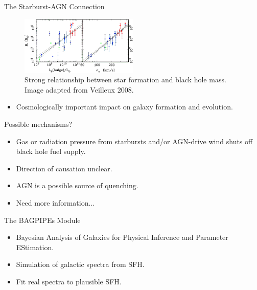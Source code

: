 \documentclass{beamer}
\begin{document}
\begin{frame}{The Starburst-AGN Connection}
  \begin{figure}
    \centering
    \includegraphics[width=0.5\textwidth]{image--002}
    \caption{Strong relationship between star formation and black hole mass. Image adapted from Veilleux 2008.\cite{Veilleux_2008}}
  \end{figure}
  \pause
  \begin{itemize}
    \item Cosmologically important impact on galaxy formation and evolution.
  \end{itemize}
\end{frame}

\begin{frame}{Possible mechanisms?}
  \begin{itemize}
    \item Gas or radiation pressure from starbursts and/or AGN-drive wind shuts off  black hole fuel supply.\pause
    \item Direction of causation unclear.\pause
    \item AGN is a possible source of quenching.\pause
    \item Need more information...
  \end{itemize}
\end{frame}

\begin{frame}{The BAGPIPEs Module}
  \begin{itemize}
    \item Bayesian Analysis of Galaxies for Physical Inference and Parameter EStimation.\pause
    \item Simulation of galactic spectra from SFH.\pause
    \item Fit real spectra to plausible SFH.
  \end{itemize}
\end{frame}
\end{document}
